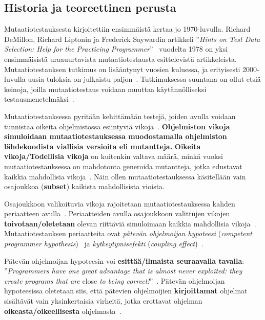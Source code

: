 \documentclass[finnish, grading]{tktltiki2}
\theoremstyle{definition}
\theoremstyle{remark}
\begin{document}
\subsection{Historia ja teoreettinen perusta}

Mutaatiotestauksesta kirjoitettiin ensimmäistä kertaa jo 1970-luvulla. Richard DeMillon, Richard Liptonin ja Frederick Saywardin artikkeli ''\textit{Hints on Test Data Selection: Help for the Practicing Programmer}''~\cite{DeMillo:Lipton:Sayward:1978} vuodelta 1978 on yksi ensimmäisistä uraauurtavista mutaatiotestausta esittelevistä artikkeleista. Mutaatiotestauksen tutkimus on lisääntynyt vuosien kuluessa, ja erityisesti 2000-luvulla uusia tuloksia on julkaistu paljon~\cite[s. 1102]{Offutt:2011}. Tutkimuksessa suuntana on ollut etsiä keinoja, joilla mutaatiotestaus voidaan muuttaa käytännölliseksi testausmenetelmäksi~\cite[s. 649]{Jia:Harman:2011}. 

Mutaatiotestauksessa pyritään kehittämään testejä, joiden avulla voidaan tunnistaa oikeita ohjelmistossa esiintyviä vikoja~\cite[s. 650]{Jia:Harman:2011}. \textbf{Ohjelmiston vikoja simuloidaan mutaatiotestauksessa muodostamalla ohjelmiston lähdekoodista viallisia versioita eli mutantteja.} \textbf{Oikeita vikoja/Todellisia vikoja} on kuitenkin valtava määrä, minkä vuoksi mutaatiotestauksessa on mahdotonta generoida mutantteja, jotka edustavat kaikkia mahdollisia vikoja~\cite[s. 650]{Jia:Harman:2011}. Näin ollen mutaatiotestauksessa käsitellään vain osajoukkoa (\textbf{subset}) kaikista mahdollisista vioista.

Osajoukkoon valikoituvia vikoja rajoitetaan mutaatiotestauksessa kahden periaatteen avulla~\cite[s. 5]{Offutt:1992:Coupling}. Periaatteiden avulla osajoukkoon valittujen vikojen \textbf{toivotaan/oletetaan} olevan riittäviä simuloimaan kaikkia mahdollisia vikoja~\cite[s. 650]{Jia:Harman:2011}. Mutaatiotestauksen periaatteita ovat \textit{pätevän ohjelmoijan hypoteesi} (\textit{competent programmer hypothesis})~\cite[s. 34]{DeMillo:Lipton:Sayward:1978} ja \textit{kytkeytymisefekti} (\textit{coupling effect})~\cite[s. 35]{DeMillo:Lipton:Sayward:1978}.

Pätevän ohjelmoijan hypoteesin voi \textbf{esittää/ilmaista seuraavalla tavalla}: ''\textit{Programmers have one great advantage that is almost never exploited: they create programs that are} close \textit{to being correct!}''~\cite[s. 34]{DeMillo:Lipton:Sayward:1978}. Pätevän ohjelmoijan hypoteesissa oletetaan siis, että pätevien ohjelmoijien \textbf{kirjoittamat} ohjelmat sisältävät vain yksinkertaisia virheitä, jotka erottavat ohjelman \textbf{oikeasta/oikeellisesta} ohjelmasta~\cite[s. 5]{Offutt:1992:Coupling}.
\end{document}
